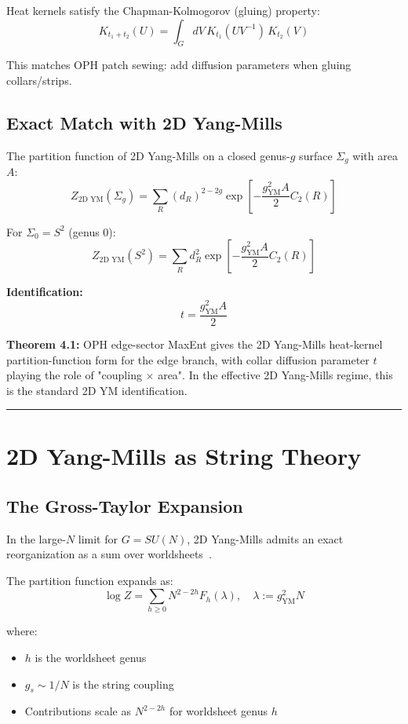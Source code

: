 Heat kernels satisfy the Chapman-Kolmogorov (gluing) property: \[K_{t_1 + t_2}(U) = \int_G dV \, K_{t_1}(UV^{-1}) \, K_{t_2}(V)\]

This matches OPH patch sewing: add diffusion parameters when gluing collars/strips.

\subsection{Exact Match with 2D Yang-Mills}\label{46-exact-match-with-2d-yang-mills}

The partition function of 2D Yang-Mills on a closed genus-\(g\) surface \(\Sigma_g\) with area \(A\): \[Z_{\text{2D YM}}(\Sigma_g) = \sum_R (d_R)^{2-2g} \exp\left[-\frac{g_{\text{YM}}^2 A}{2} C_2(R)\right]\]

For \(\Sigma_0 = S^2\) (genus 0): \[Z_{\text{2D YM}}(S^2) = \sum_R d_R^2 \exp\left[-\frac{g_{\text{YM}}^2 A}{2} C_2(R)\right]\]

\textbf{Identification:} \[t = \frac{g_{\text{YM}}^2 A}{2}\]

\textbf{Theorem 4.1:} OPH edge-sector MaxEnt gives the 2D Yang-Mills heat-kernel partition-function form for the edge branch, with collar diffusion parameter \(t\) playing the role of "coupling \ensuremath{\times} area". In the effective 2D Yang-Mills regime, this is the standard 2D YM identification.

\begin{center}\rule{0.5\linewidth}{0.5pt}\end{center}

\section{2D Yang-Mills as String Theory}\label{5-2d-yang-mills-as-string-theory}

\subsection{The Gross-Taylor Expansion}\label{51-the-gross-taylor-expansion}

In the large-\(N\) limit for \(G = SU(N)\), 2D Yang-Mills admits an exact reorganization as a sum over worldsheets~\cite{grossTaylor93}.

The partition function expands as: \[\log Z = \sum_{h \geq 0} N^{2-2h} F_h(\lambda), \quad \lambda := g_{\text{YM}}^2 N\]

where:

\begin{itemize}
\tightlist
\item
  \(h\) is the worldsheet genus
\item
  \(g_s \sim 1/N\) is the string coupling
\item
  Contributions scale as \(N^{2-2h}\) for worldsheet genus \(h\)
\end{itemize}

